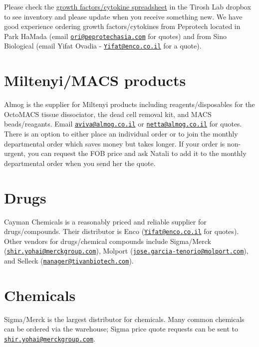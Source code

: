 \documentclass[]{book}
\begin{document}
Please check the
\href{https://www.dropbox.com/s/q0dn3a3th12y822/cytokines_GFs_Tirosh.xlsx?dl=0}{growth
factors/cytokine spreadsheet} in the Tirosh Lab dropbox to see inventory
and please update when you receive something new. We have good
experience ordering growth factors/cytokines from Peprotech located in
Park HaMada (email
\href{mailto:ori@peprotechasia.com}{\nolinkurl{ori@peprotechasia.com}}
for quotes) and from Sino Biological (email Yifat Ovadia -
\href{mailto:Yifat@enco.co.il}{\nolinkurl{Yifat@enco.co.il}} for a
quote).

\section{Miltenyi/MACS products}\label{miltenyimacs-products}

Almog is the supplier for Miltenyi products including
reagents/disposables for the OctoMACS tissue dissociator, the dead cell
removal kit, and MACS beads/reagants. Email
\href{mailto:aviva@almog.co.il}{\nolinkurl{aviva@almog.co.il}} or
\href{mailto:netta@almog.co.il}{\nolinkurl{netta@almog.co.il}} for
quotes. There is an option to either place an individual order or to
join the monthly departmental order which saves money but takes longer.
If your order is non-urgent, you can request the FOB price and ask
Natali to add it to the monthly departmental order when you send her the
quote.

\section{Drugs}\label{drugs}

Cayman Chemicals is a reasonably priced and reliable supplier for
drugs/compounds. Their distributor is Enco
(\href{mailto:Yifat@enco.co.il}{\nolinkurl{Yifat@enco.co.il}} for
quotes). Other vendors for drugs/chemical compounds include Sigma/Merck
(\href{mailto:shir.yohai@merckgroup.com}{\nolinkurl{shir.yohai@merckgroup.com}}),
Molport
(\href{mailto:jose.garcia-tenorio@molport.com}{\nolinkurl{jose.garcia-tenorio@molport.com}}),
and Selleck
(\href{mailto:manager@tivanbiotech.com}{\nolinkurl{manager@tivanbiotech.com}}).

\section{Chemicals}\label{chemicals}

Sigma/Merck is the largest distributor for chemicals. Many common
chemicals can be ordered via the warehouse; Sigma price quote requests
can be sent to
\href{mailto:shir.yohai@merckgroup.com}{\nolinkurl{shir.yohai@merckgroup.com}}.
\end{document}
